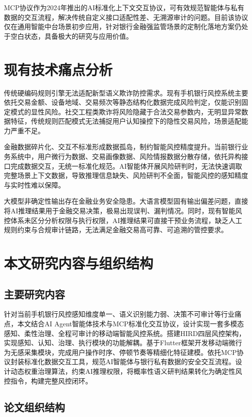 \documentclass[twoside,openright]{xduugthesis}
\begin{document}
MCP协议作为2024年推出的AI标准化上下文交互协议，可有效规范智能体与私有数据的交互流程，解决传统自定义接口适配性差、无溯源审计的问题。目前该协议仅在通用智能中台场景初步应用，针对银行金融强监管场景的定制化落地方案仍处于空白状态，具备极大的研究与应用价值。

\section{现有技术痛点分析}

传统硬编码规则引擎无法适配新型语义欺诈防控需求。现有手机银行风控系统主要依托交易金额、设备地域、交易频次等静态结构化数据完成风险判定，仅能识别固定模式的显性风险。社交工程类欺诈将风险隐藏于合法交易参数内，无明显异常数据特征，传统规则匹配模式无法捕捉用户认知操控下的隐性交易风险，场景适配能力严重不足\cite{nicolaou2025llm}。

金融数据碎片化、交互不标准形成数据孤岛，制约智能风控精度提升。当前银行业务系统中，用户微行为数据、交易画像数据、风险情报数据分散存储，依托异构接口完成数据交互，无统一标准化规范。AI智能体开展风险研判时，无法快速调取完整场景上下文数据，导致推理信息缺失、风险研判不全面，智能风控的感知精度与实时性难以保障。

大模型非确定性输出存在金融业务安全隐患。大语言模型固有输出偏差问题，直接将AI推理结果用于金融交易决策，极易出现误判、漏判情况。同时，现有智能风控体系未区分分析权限与执行权限，AI推理结果可直接干预业务流程，缺乏人工规则约束与合规审计链路，无法满足金融交易高可靠、可追溯的管控要求。

\section{本文研究内容与组织结构}

\subsection{主要研究内容}

针对当前手机银行风控感知维度单一、语义识别能力弱、决策不可审计等行业痛点，本文结合AI Agent智能体技术与MCP标准化交互协议，设计实现一套多模态感知、柔性治理、全程可审计的移动端智能风控系统。搭建HIRD四层风控架构，实现感知、认知、治理、执行模块的功能解耦\cite{agnihotram2025agentic}。基于Flutter框架开发移动端微行为无感采集模块，完成用户操作时序、停顿节奏等精细化特征建模。依托MCP协议封装标准化数据交互工具，规范AI智能体与银行私有数据的安全交互流程。设计动态权重治理算法，约束AI推理权限，将概率性语义研判结果转化为确定性风控指令，构建完整风控闭环。

\subsection{论文组织结构}
\end{document}
